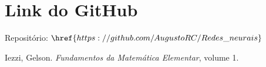 \documentclass{article}
\begin{document}
\section{Link do GitHub}
Repositório: $\href{https://github.com/AugustoRC/Redes\_neurais}$
\newpage

\begin{thebibliography}{9}
  Iezzi, Gelson. \textit{Fundamentos da Matemática Elementar}, volume 1.
\end{thebibliography}
\end{document}
